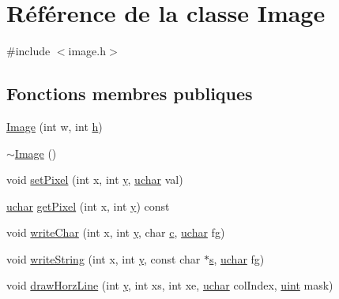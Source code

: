 \hypertarget{class_image}{}\section{Référence de la classe Image}
\label{class_image}


{\ttfamily \#include $<$image.\+h$>$}

\subsection*{Fonctions membres publiques}
\begin{DoxyCompactItemize}
\item 
\hyperlink{class_image_a05c964ca59502cc32c30e8ab89b5e920}{Image} (int w, int \hyperlink{060__command__switch_8tcl_af96fd0966e32a310a0778d2e5c357700}{h})
\item 
\hyperlink{class_image_a0294f63700543e11c0f0da85601c7ae5}{$\sim$\+Image} ()
\item 
void \hyperlink{class_image_ac05a72f347421d0b00091faed2216393}{set\+Pixel} (int x, int \hyperlink{058__bracket__recursion_8tcl_a2fb1c5cf58867b5bbc9a1b145a86f3a0}{y}, \hyperlink{qglobal_8h_a65f85814a8290f9797005d3b28e7e5fc}{uchar} val)
\item 
\hyperlink{qglobal_8h_a65f85814a8290f9797005d3b28e7e5fc}{uchar} \hyperlink{class_image_a66c00fb22cb4cd7da60bc60d6a260c18}{get\+Pixel} (int x, int \hyperlink{058__bracket__recursion_8tcl_a2fb1c5cf58867b5bbc9a1b145a86f3a0}{y}) const 
\item 
void \hyperlink{class_image_aa1af4353b607e32f3998045574697543}{write\+Char} (int x, int \hyperlink{058__bracket__recursion_8tcl_a2fb1c5cf58867b5bbc9a1b145a86f3a0}{y}, char \hyperlink{060__command__switch_8tcl_ab14f56bc3bd7680490ece4ad7815465f}{c}, \hyperlink{qglobal_8h_a65f85814a8290f9797005d3b28e7e5fc}{uchar} fg)
\item 
void \hyperlink{class_image_a0f9e1b9dbb51e3c046f1736f33f7a1f9}{write\+String} (int x, int \hyperlink{058__bracket__recursion_8tcl_a2fb1c5cf58867b5bbc9a1b145a86f3a0}{y}, const char $\ast$\hyperlink{060__command__switch_8tcl_a011c73f2dbb87635a3b4206c72355f6e}{s}, \hyperlink{qglobal_8h_a65f85814a8290f9797005d3b28e7e5fc}{uchar} fg)
\item 
void \hyperlink{class_image_a72e5036b6f5976a361a91381bde4e5c4}{draw\+Horz\+Line} (int \hyperlink{058__bracket__recursion_8tcl_a2fb1c5cf58867b5bbc9a1b145a86f3a0}{y}, int xs, int xe, \hyperlink{qglobal_8h_a65f85814a8290f9797005d3b28e7e5fc}{uchar} col\+Index, \hyperlink{qglobal_8h_a4d3943ddea65db7163a58e6c7e8df95a}{uint} mask)

\end{DoxyCompactItemize}

